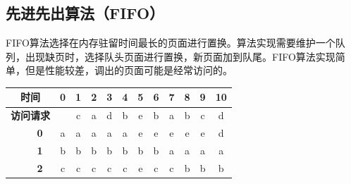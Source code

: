 \subsection{先进先出算法（FIFO）}

FIFO算法选择在内存驻留时间最长的页面进行置换。算法实现需要维护一个队列，出现缺页时，选择队头页面进行置换，新页面加到队尾。FIFO算法实现简单，但是性能较差，调出的页面可能是经常访问的。

\begin{table}[H]
	\centering
	\begin{tabular}{|clc|c|c|c|c|c|c|c|c|c|c|c|}
		\hline
		\multicolumn{3}{|c|}{\textbf{时间}}                       & \textbf{0} & \textbf{1} & \textbf{2}               & \textbf{3}               & \textbf{4}               & \textbf{5}               & \textbf{6}               & \textbf{7}               & \textbf{8}               & \textbf{9}               & \textbf{10}                                         \\ \hline
		\multicolumn{3}{|c|}{\textbf{访问请求}}                   &            & c          & a                        & d                        & b                        & e                        & b                        & a                        & b                        & c                        & d                                                   \\ \hline
		\multicolumn{2}{|c|}{}                                    & \textbf{0} & a          & {\color[HTML]{333333} a} & {\color[HTML]{FE0000} a} & {\color[HTML]{333333} a} & {\color[HTML]{333333} a} & {\color[HTML]{333333} e} & {\color[HTML]{333333} e} & {\color[HTML]{FE0000} e} & {\color[HTML]{333333} e} & {\color[HTML]{333333} e} & {\color[HTML]{FE0000} d} \\ \cline{3-14}
		\multicolumn{2}{|c|}{}                                    & \textbf{1} & b          & {\color[HTML]{333333} b} & {\color[HTML]{333333} b} & {\color[HTML]{333333} b} & {\color[HTML]{FE0000} b} & {\color[HTML]{333333} b} & {\color[HTML]{FE0000} b} & {\color[HTML]{333333} a} & {\color[HTML]{333333} a} & {\color[HTML]{333333} a} & a                        \\ \cline{3-14}
		\multicolumn{2}{|c|}{}                                    & \textbf{2} & c          & {\color[HTML]{FE0000} c} & {\color[HTML]{333333} c} & {\color[HTML]{333333} c} & {\color[HTML]{333333} c} & {\color[HTML]{FE0000} e} & {\color[HTML]{333333} c} & {\color[HTML]{333333} c} & {\color[HTML]{FE0000} b} & {\color[HTML]{333333} b} & b                        \\ \cline{3-14}

\end{tabular}
\end{table}
